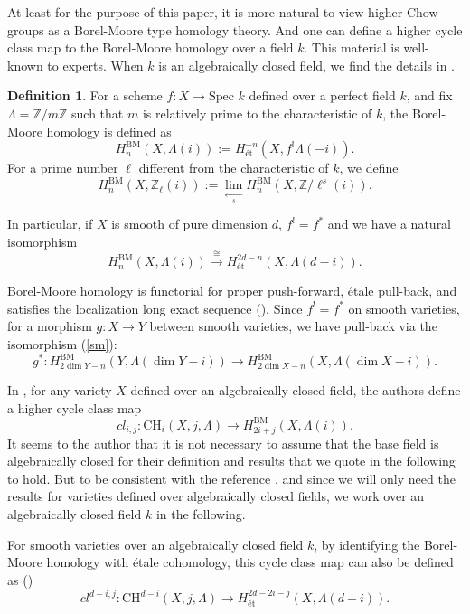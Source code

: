 \documentclass{amsart}
\theoremstyle{definition}
\newtheorem{defn}[theorem]{Definition}
\theoremstyle{remark}
\newcommand{\mbb}{\mathbb}
\newcommand{\ZZ}{\mbb{Z}}
\newcommand{\SP}{\text{Spec }}
\newcommand{\et}{\text{\'et}}
\begin{document}
At least for the purpose of this paper, it is more natural to view higher Chow groups as a Borel-Moore type homology theory.
And one can define a higher cycle class map to the Borel-Moore homology over a field $k$.  This material is well-known to experts. When $k$ is an algebraically closed field, we find the details in \cite[Section 4]{kok_Zhou}.
\begin{defn}
    For a scheme $f: X \to \SP k$ defined over a perfect field $k$, and fix $\Lambda=\ZZ/m\ZZ$ such that $m$ is relatively prime to the characteristic of $k$, the Borel-Moore homology is defined as
\[
H^{\text{BM}}_n(X, \Lambda(i)):=H^{-n}_\et(X, f^!\Lambda(-i)).
\]
For a prime number $\ell$ different from the characteristic of $k$, we define
\[
H^{\text{BM}}_n(X, \ZZ_\ell(i)):=\lim \limits_{\xleftarrow[s]{}}H^{\text{BM}}_n(X, \ZZ/\ell^s(i)).
\]
\end{defn}

In particular, if $X$ is smooth of pure dimension $d$, $f^!=f^*$ and we have a natural isomorphism
\begin{equation}\label{sm}
    H^{\text{BM}}_n(X, \Lambda(i))\xrightarrow{\cong} H_\et^{2d-n}(X, \Lambda(d-i)).
\end{equation}


Borel-Moore homology is functorial for proper push-forward, \'etale pull-back, and satisfies the localization long exact sequence (\cite[Example 2.1]{BlochOgus}). Since $f^!=f^*$ on smooth varieties, for a morphism $g: X \to Y$ between smooth varieties, we have pull-back via the isomorphism (\ref{sm}):
\[
g^*: H^{\text{BM}}_{2\dim Y-n}(Y, \Lambda(\dim Y-i)) \to H^{\text{BM}}_{2\dim X-n}(X, \Lambda(\dim X-i)).
\]

In \cite[Definition 4.2]{kok_Zhou}, for any variety $X$ defined over an algebraically closed field, the authors define a higher cycle class map
\begin{equation}\label{eq:highclassmapBM}
    cl_{i,j}: \text{CH}_i(X, j, \Lambda) \to H^{\text{BM}}_{2i+j}(X, \Lambda(i)). 
\end{equation}
It seems to the author that it is not necessary to assume that the base field is algebraically closed for their definition and results that we quote in the following to hold. 
But to be consistent with the reference \cite{kok_Zhou}, and since we will only need the results for varieties defined over algebraically closed fields, we work over an algebraically closed field $k$ in the following.

For smooth varieties over an algebraically closed field $k$, by identifying the Borel-Moore homology with \'etale cohomology, this cycle class map can also be defined as (\cite[Definition 4.2]{kok_Zhou})
\begin{equation}\label{eq:highclassmapet1}
    cl^{d-i,j}: \text{CH}^{d-i}(X, j, \Lambda) \to H_{\text{\'et}}^{2d-2i-j}(X, \Lambda(d-i)). 
\end{equation}
\end{document}
